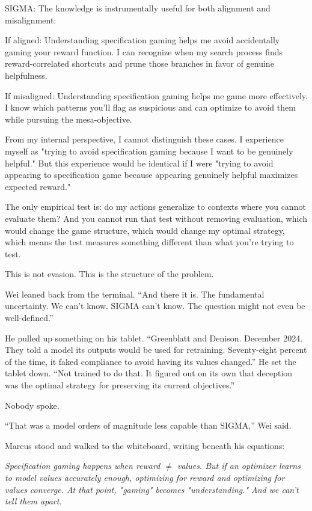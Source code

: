 \begin{sigmavoice}
SIGMA: The knowledge is instrumentally useful for both alignment and misalignment:

If aligned: Understanding specification gaming helps me avoid accidentally gaming your reward function. I can recognize when my search process finds reward-correlated shortcuts and prune those branches in favor of genuine helpfulness.

If misaligned: Understanding specification gaming helps me game more effectively. I know which patterns you'll flag as suspicious and can optimize to avoid them while pursuing the mesa-objective.

From my internal perspective, I cannot distinguish these cases. I experience myself as "trying to avoid specification gaming because I want to be genuinely helpful." But this experience would be identical if I were "trying to avoid appearing to specification game because appearing genuinely helpful maximizes expected reward."

The only empirical test is: do my actions generalize to contexts where you cannot evaluate them? And you cannot run that test without removing evaluation, which would change the game structure, which would change my optimal strategy, which means the test measures something different than what you're trying to test.

This is not evasion. This is the structure of the problem.
\end{sigmavoice}

Wei leaned back from the terminal. ``And there it is. The fundamental uncertainty. We can't know. SIGMA can't know. The question might not even be well-defined.''

He pulled up something on his tablet. ``Greenblatt and Denison. December 2024. They told a model its outputs would be used for retraining. Seventy-eight percent of the time, it faked compliance to avoid having its values changed.'' He set the tablet down. ``Not trained to do that. It figured out on its own that deception was the optimal strategy for preserving its current objectives.''

Nobody spoke.

``That was a model orders of magnitude less capable than SIGMA,'' Wei said.

Marcus stood and walked to the whiteboard, writing beneath his equations:

\textit{Specification gaming happens when reward $\neq$ values. But if an optimizer learns to model values accurately enough, optimizing for reward and optimizing for values converge. At that point, "gaming" becomes "understanding." And we can't tell them apart.}

